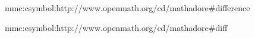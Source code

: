 \startsetups mmc:csymbol:http://www.openmath.org/cd/mathadore\string#difference
    \MMLcreset
    \Delta\getXMLstackdata\plustwo
\stopsetups


\startsetups mmc:csymbol:http://www.openmath.org/cd/mathadore\string#diff
    \MMLcreset
     {
        \getXMLstackdata\plusthree
    }
\stopsetups

\protect \endinput
